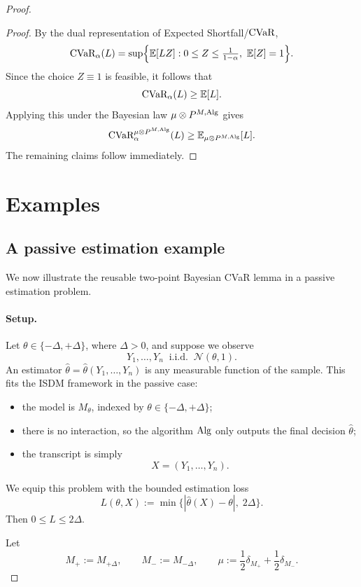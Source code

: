 \documentclass[conference]{IEEEtran}
\begin{document}
\begin{proof}[Proof]
\begin{proof}
By the dual representation of Expected Shortfall/\(\textup{CVaR}\),
\[
\textup{CVaR}_\alpha(L)
=
\sup\Bigl\{
\mathbb{E}[LZ]:
0\le Z\le \tfrac{1}{1-\alpha},\ \mathbb{E}[Z]=1
\Bigr\}.
\]
Since the choice \(Z\equiv 1\) is feasible, it follows that
\[
\textup{CVaR}_\alpha(L)\ge \mathbb{E}[L].
\]
Applying this under the Bayesian law \(\mu\otimes P^{M,\textup{Alg}}\) gives
\[
\textup{CVaR}_\alpha^{\mu\otimes P^{M,\textup{Alg}}}(L)
\ge
\mathbb{E}_{\mu\otimes P^{M,\textup{Alg}}}[L].
\]
The remaining claims follow immediately.
\end{proof}


\section{Examples}

\subsection{A passive estimation example}

We now illustrate the reusable two-point Bayesian \textup{CVaR} lemma in a passive estimation problem.

\paragraph{Setup.}
Let \(\theta\in\{-\Delta,+\Delta\}\), where \(\Delta>0\), and suppose we observe
\[
Y_1,\dots,Y_n \;\;\text{i.i.d.}\;\; \mathcal{N}(\theta,1).
\]
An estimator \(\widehat{\theta}=\widehat{\theta}(Y_1,\dots,Y_n)\) is any measurable function of the sample.
This fits the ISDM framework in the passive case:
\begin{itemize}
\item the model is \(M_\theta\), indexed by \(\theta\in\{-\Delta,+\Delta\}\);
\item there is no interaction, so the algorithm \(\textup{Alg}\) only outputs the final decision \(\widehat{\theta}\);
\item the transcript is simply
\[
X=(Y_1,\dots,Y_n).
\]
\end{itemize}

We equip this problem with the bounded estimation loss
\[
L(\theta,X):=\min\{|\widehat{\theta}(X)-\theta|,\;2\Delta\}.
\]
Then \(0\le L\le 2\Delta\).

Let
\[
M_+ := M_{+\Delta},\qquad M_-:=M_{-\Delta},
\qquad
\mu:=\frac12\delta_{M_+}+\frac12\delta_{M_-}.
\]


\end{proof}
\end{document}
